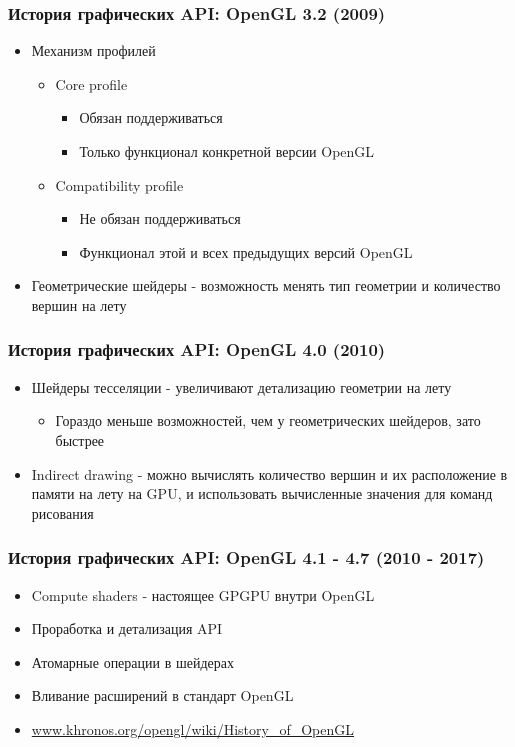 \documentclass{beamer}
\begin{document}
\begin{frame}
\frametitle{История графических API: OpenGL 3.2 (2009)}
\begin{itemize}
\item Механизм профилей
\begin{itemize}
\item Core profile
\begin{itemize}
\item Обязан поддерживаться
\item Только функционал конкретной версии OpenGL
\end{itemize}
\item Compatibility profile
\begin{itemize}
\item Не обязан поддерживаться
\item Функционал этой и всех предыдущих версий OpenGL
\end{itemize}
\end{itemize}
\pause
\item Геометрические шейдеры - возможность менять тип геометрии и количество вершин на лету
\end{itemize}
\end{frame}

\begin{frame}
\frametitle{История графических API: OpenGL 4.0 (2010)}
\begin{itemize}
\item Шейдеры тесселяции - увеличивают детализацию геометрии на лету
\begin{itemize}
\item Гораздо меньше возможностей, чем у геометрических шейдеров, зато быстрее
\end{itemize}
\pause
\item Indirect drawing - можно вычислять количество вершин и их расположение в памяти на лету на GPU, и использовать вычисленные значения для команд рисования
\end{itemize}
\end{frame}

\begin{frame}
\frametitle{История графических API: OpenGL 4.1 - 4.7 (2010 - 2017)}
\begin{itemize}
\item Compute shaders - настоящее GPGPU внутри OpenGL
\item Проработка и детализация API
\item Атомарные операции в шейдерах
\item Вливание расширений в стандарт OpenGL
\item \url{www.khronos.org/opengl/wiki/History_of_OpenGL}
\end{itemize}
\end{frame}
\end{document}
